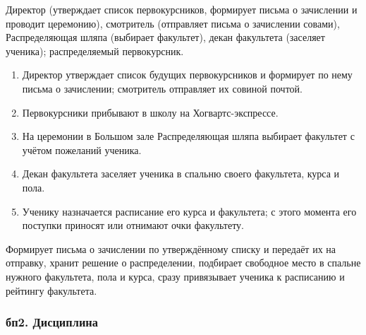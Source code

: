 \documentclass[a4paper,12pt]{article}
\begin{document}
\begin{description}[leftmargin=0pt,labelindent=0pt,style=nextline]
\item[Участники] Директор (утверждает список первокурсников, формирует письма о зачислении и проводит церемонию),
  смотритель (отправляет письма о зачислении совами), Распределяющая шляпа (выбирает
  факультет), декан факультета (заселяет ученика);
  распределяемый первокурсник.
\item[Ход процесса]\leavevmode
  \begin{enumerate}
        \item Директор утверждает список будущих первокурсников и формирует по нему письма о зачислении; смотритель отправляет их совиной почтой.
    \item Первокурсники прибывают в школу на Хогвартс-экспрессе.
    \item На церемонии в Большом зале Распределяющая шляпа выбирает факультет с учётом пожеланий ученика.
    \item Декан факультета заселяет ученика в спальню своего факультета, курса и пола.
    \item Ученику назначается расписание его курса и факультета; с этого момента его поступки приносят или отнимают очки факультету.
  \end{enumerate}
 
\item[Роль ИС] Формирует письма о зачислении по утверждённому списку и передаёт их на отправку, хранит решение о распределении, подбирает свободное место в спальне
  нужного факультета, пола и курса, сразу привязывает ученика к расписанию и рейтингу
  факультета.
\end{description}
 
\subsubsection*{бп2. Дисциплина}
 
\end{document}
